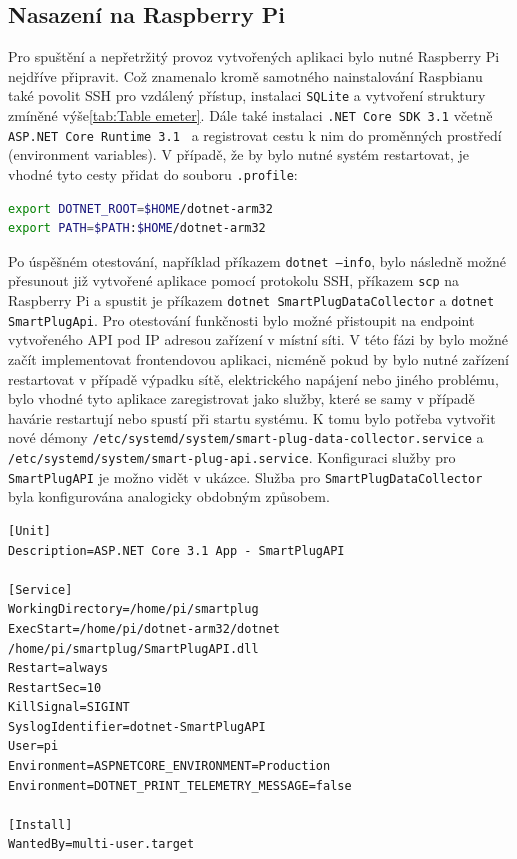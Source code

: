 \documentclass[czech,master,dept460,male,cpp,cpdeclaration,oneside]{diploma}
\begin{document}
\pagebreak

\subsection{Nasazení na Raspberry Pi}
Pro spuštění a nepřetržitý provoz vytvořených aplikaci bylo nutné Raspberry Pi nejdříve připravit. Což znamenalo kromě samotného nainstalování Raspbianu také povolit SSH pro vzdálený přístup, instalaci \texttt{SQLite} a vytvoření struktury zmíněné výše\ref{tab:Table emeter}. Dále také instalaci \texttt{.NET Core SDK 3.1} včetně \texttt{ASP.NET Core Runtime 3.1 } a registrovat cestu k nim do proměnných prostředí (environment variables). V případě, že by bylo nutné systém restartovat, je vhodné tyto cesty přidat do souboru \texttt{.profile}:
\bigbreak
\begin{lstlisting}[language=bash,caption=Proměnné prostředí pro cesty k .NET Core SDK a ASP.NET Runtime]
export DOTNET_ROOT=$HOME/dotnet-arm32
export PATH=$PATH:$HOME/dotnet-arm32
\end{lstlisting}
\bigbreak
Po úspěšném otestování, například příkazem \texttt{dotnet --info}, bylo následně možné přesunout již vytvořené aplikace pomocí protokolu SSH, příkazem \texttt{scp} na Raspberry Pi a spustit je příkazem \texttt{dotnet SmartPlugDataCollector} a \texttt{dotnet SmartPlugApi}. Pro otestování funkčnosti bylo možné přistoupit na endpoint vytvořeného API pod IP adresou zařízení v místní síti. V této fázi by bylo možné začít implementovat frontendovou aplikaci, nicméně pokud by bylo nutné zařízení restartovat v případě výpadku sítě, elektrického napájení nebo jiného problému, bylo vhodné tyto aplikace zaregistrovat jako služby, které se samy v případě havárie restartují nebo spustí při startu systému. K tomu bylo potřeba vytvořit nové démony \texttt{/etc/systemd/system/smart-plug-data-collector.service} a \texttt{/etc/systemd/system/smart-plug-api.service}. Konfiguraci služby pro \texttt{SmartPlugAPI} je možno vidět v ukázce. Služba pro \texttt{SmartPlugDataCollector} byla konfigurována analogicky obdobným způsobem. 
\bigbreak
\begin{lstlisting}[language={},caption=Konfigurace jedné z aplikací jako systémové služby]
[Unit]
Description=ASP.NET Core 3.1 App - SmartPlugAPI

[Service]
WorkingDirectory=/home/pi/smartplug
ExecStart=/home/pi/dotnet-arm32/dotnet /home/pi/smartplug/SmartPlugAPI.dll
Restart=always
RestartSec=10
KillSignal=SIGINT
SyslogIdentifier=dotnet-SmartPlugAPI
User=pi
Environment=ASPNETCORE_ENVIRONMENT=Production
Environment=DOTNET_PRINT_TELEMETRY_MESSAGE=false

[Install]
WantedBy=multi-user.target
\end{lstlisting}
\end{document}
